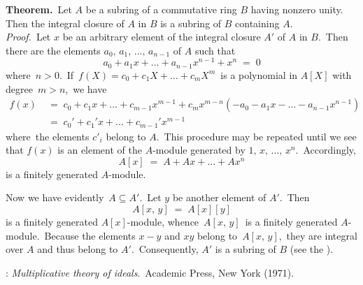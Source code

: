 \documentclass[12pt]{article}
\theoremstyle{definition}
\begin{document}
\textbf{Theorem.}\, Let $A$ be a subring of a commutative ring $B$ having nonzero unity.\, Then the integral closure of 
$A$ in $B$ is a subring of $B$ containing $A$.\\

\emph{Proof.}\, Let $x$ be an arbitrary element of the integral closure $A'$ of $A$ in $B$.\, Then there are the elements $a_0,\,a_1,\,\ldots,\,a_{n-1}$ of $A$ such that 
$$a_0\!+\!a_1x\!+\ldots+\!a_{n-1}x^{n-1}\!+\!x^n \;=\; 0$$
where\, $n > 0$.\, If\, $f(X) = c_0\!+\!c_1X\!+\ldots+\!c_mX^m$\, is a polynomial in $A[X]$ with degree\, $m > n$,\, we have
\begin{align*}
f(x) &\;=\; c_0\!+\!c_1x\!+\ldots+\!c_{m-1}x^{m-1}\!+\!c_mx^{m-n}(-a_0\!-\!a_1x\!-\ldots-\!a_{n-1}x^{n-1})\\
     &\;=\; c_0'\!+\!c_1'x\!+\ldots+\!c_{m-1}'x^{m-1}
\end{align*}
where\, the elements $c'_i$ belong to $A$.\, This procedure may be repeated until we see that $f(x)$ is an element of the $A$-module generated by $1,\,x,\,\ldots,\,x^n$.\, Accordingly, 
$$A[x] \;=\; A+Ax+\ldots+Ax^n$$
is a finitely generated $A$-module.

Now we have evidently\, $A \subseteq A'$.\, Let $y$ be another element of $A'$.\, Then
$$A[x,\,y] \;=\; A[x][y]$$
is a finitely generated $A[x]$-module, whence\, $A[x,\,y]$\, is a finitely generated $A$-module.\, Because the elements 
$x\!-\!y$ and $xy$ belong to\, $A[x,\,y]$,\, they are integral over $A$ and thus belong to $A'$.\, Consequently, $A'$ is a subring of $B$ (see the ).

\begin{thebibliography}{8}
: {\em Multiplicative theory of ideals}.\, Academic Press, New York (1971).
\end{thebibliography}
\end{document}
